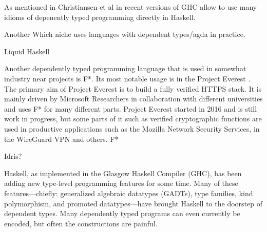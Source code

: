 As mentioned in Christiansen et al in \cite{10.1145/3341704} recent versions of GHC allow to use many idioms of depenently typed programming directly in Haskell.

Another 
Which niche uses languages with dependent types/agda in practice.

Liquid Haskell \cite{DBLP:journals/corr/abs-1711-03842, 10.1145/3299711.3242756}

Another dependently typed programming language that is used in somewhat industry near projects is F*. 
Its most notable usage is in the Project Everest \cite{project_everest_github_io}. The primary aim of Project Everest is to build a fully verified HTTPS stack.
It is mainly driven by Microsoft Researchers in collaboration with different universities and uses F* for many different parts.
Project Everest started in 2016 and is still work in progress, but some parts of it such as verified cryptographic functions are used in productive applications such as the Mozilla Network Security Services\cite{project_everest_slides},  in the WireGuard VPN and others. 
F* 

Idris?

Haskell, as implemented in the Glasgow Haskell Compiler (GHC), has been adding new type-level programming features for some time. Many of these features---chiefly: generalized algebraic datatypes (GADTs), type families, kind polymorphism, and promoted datatypes---have brought Haskell to the doorstep of dependent types. Many dependently typed programs can even currently be encoded, but often the constructions are painful. \cite{DBLP:journals/corr/Eisenberg16}
